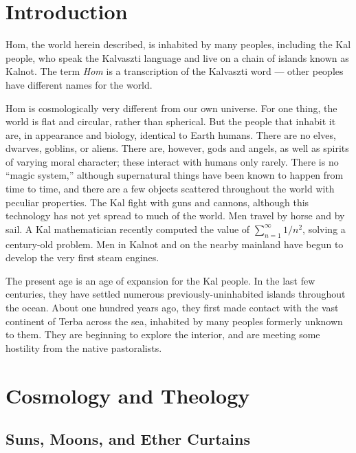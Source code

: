 \documentclass{article}
\title{\thetitle}
\author{\theauthor}
\begin{document}
\maketitle

\section{Introduction}

Hom, the world herein described, is inhabited by many peoples, including the Kal people, who speak the Kalvaszti language and live on a chain of islands known as Kalnot. The term \textit{Hom} is a transcription of the Kalvaszti word  --- other peoples have different names for the world.

Hom is cosmologically very different from our own universe. For one thing, the world is flat and circular, rather than spherical. But the people that inhabit it are, in appearance and biology, identical to Earth humans. There are no elves, dwarves, goblins, or aliens. There are, however, gods and angels, as well as spirits of varying moral character; these interact with humans only rarely. There is no ``magic system,'' although supernatural things have been known to happen from time to time, and there are a few objects scattered throughout the world with peculiar properties. The Kal fight with guns and cannons, although this technology has not yet spread to much of the world. Men travel by horse and by sail. A Kal mathematician recently computed the value of $\sum_{n = 1}^\infty 1/n^2$, solving a century-old problem. Men in Kalnot and on the nearby mainland have begun to develop the very first steam engines.

The present age is an age of expansion for the Kal people. In the last few centuries, they have settled numerous previously-uninhabited islands throughout the ocean. About one hundred years ago, they first made contact with the vast continent of Terba across the sea, inhabited by many peoples formerly unknown to them. They are beginning to explore the interior, and are meeting some hostility from the native pastoralists.  

\section{Cosmology and Theology}

\subsection{Suns, Moons, and Ether Curtains}
\end{document}
